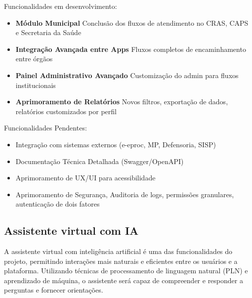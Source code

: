 Funcionalidades em desenvolvimento:
\begin{itemize}
   \item \textbf{Módulo Municipal} Conclusão dos fluxos de atendimento no CRAS, CAPS e Secretaria da Saúde
   \item \textbf{Integração Avançada entre Apps} Fluxos completos de encaminhamento entre órgãos
   \item \textbf{Painel Administrativo Avançado} Customização do admin para fluxos institucionais
   \item \textbf{Aprimoramento de Relatórios} Novos filtros, exportação de dados, relatórios customizados por perfil
\end{itemize}


Funcionalidades Pendentes:
\begin{itemize}
    \item Integração com sistemas externos (e-eproc, MP, Defensoria, SISP)
    \item Documentação Técnica Detalhada (Swagger/OpenAPI)
    \item Aprimoramento de UX/UI para acessibilidade
    
    \item Aprimoramento de Segurança, Auditoria de logs, permissões granulares, autenticação de dois fatores
\end{itemize}

\subsection{Assistente virtual com IA}

\par A assistente virtual com inteligência artificial é uma das funcionalidades do projeto, permitindo interações mais naturais e eficientes entre os usuários e a plataforma. Utilizando técnicas de processamento de linguagem natural (PLN) e aprendizado de máquina, o assistente será capaz de compreender e responder a perguntas e fornecer orientações.

